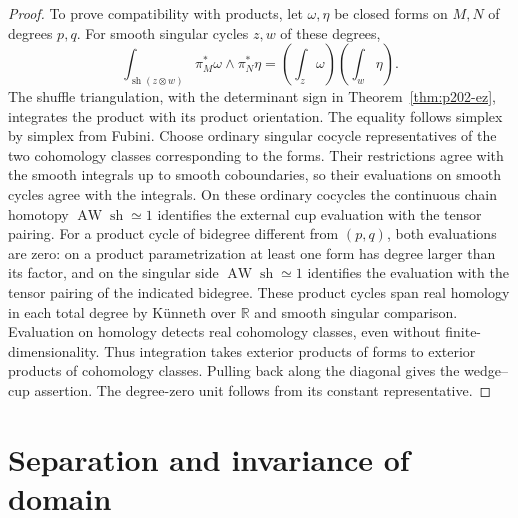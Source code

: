 \documentclass[11pt,oneside,openany]{book}
\theoremstyle{plain}
\theoremstyle{definition}
\theoremstyle{remark}
\begin{document}
\begin{proof}
To prove compatibility with products, let \(\omega,\eta\)
be closed forms on \(M,N\) of degrees \(p,q\). For smooth
singular cycles \(z,w\) of these degrees,
\[
 \int_{\operatorname{sh}(z\otimes w)}
       \pi_M^*\omega\wedge\pi_N^*\eta
   =\left(\int_z\omega\right)\left(\int_w\eta\right).
\]
The shuffle triangulation, with the determinant sign in
Theorem~\ref{thm:p202-ez}, integrates the product with
its product orientation. The equality follows simplex
by simplex from Fubini. Choose ordinary singular
cocycle representatives of the two cohomology classes
corresponding to the forms. Their restrictions agree
with the smooth integrals up to smooth coboundaries,
so their evaluations on smooth cycles agree with the
integrals. On these ordinary cocycles the continuous
chain homotopy \(\operatorname{AW}\operatorname{sh}\simeq1\)
identifies the external cup evaluation with the tensor
pairing. For a product cycle of bidegree
different from \((p,q)\), both evaluations are zero:
on a product parametrization at least one form has
degree larger than its factor, and on the singular
side \(\operatorname{AW}\operatorname{sh}\simeq1\)
identifies the evaluation with the tensor pairing of
the indicated bidegree. These product cycles span
real homology in each total degree by K\"unneth over
\(\mathbb R\) and smooth singular comparison. Evaluation
on homology detects real cohomology classes, even without
finite-dimensionality. Thus integration takes exterior
products of forms to exterior products of cohomology
classes. Pulling back along the diagonal gives the
wedge--cup assertion. The degree-zero unit follows from
its constant representative.
\end{proof}

\section{Separation and invariance of domain}\label{p202:T34}
\end{document}
